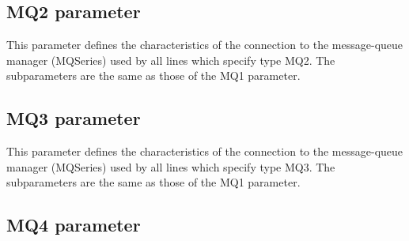 \documentclass[letterpaper,10pt,english]{sphinxmanual}
\begin{document}
\subsection{MQ2 parameter}
\label{\detokenize{Installation_Guide:mq2-parameter}}
\begin{sphinxVerbatim}[commandchars=\\\{\}]
\PYG{p}{[}\PYG{p}{]}             
\end{sphinxVerbatim}

This parameter defines the characteristics of the connection to the message-queue manager (MQSeries) used by all lines which specify type MQ2. The subparameters are the same as those of the MQ1 parameter.


\subsection{MQ3 parameter}
\label{\detokenize{Installation_Guide:mq3-parameter}}
\begin{sphinxVerbatim}[commandchars=\\\{\}]
\PYG{p}{[}\PYG{p}{]}             
\end{sphinxVerbatim}

This parameter defines the characteristics of the connection to the message-queue manager (MQSeries) used by all lines which specify type MQ3. The subparameters are the same as those of the MQ1 parameter.


\subsection{MQ4 parameter}
\label{\detokenize{Installation_Guide:mq4-parameter}}
\begin{sphinxVerbatim}[commandchars=\\\{\}]
\PYG{p}{[}\PYG{p}{]}    
\end{sphinxVerbatim}
\end{document}
